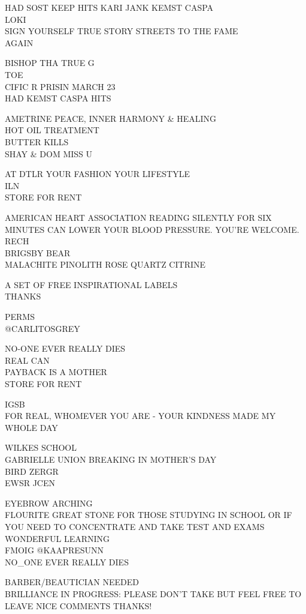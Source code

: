 \documentclass[10pt,letterpaper]{article}
\begin{document}
HAD SOST KEEP HITS KARI JANK KEMST CASPA\\
LOKI\\
SIGN YOURSELF TRUE STORY STREETS TO THE FAME\\
AGAIN

BISHOP THA TRUE G\\
TOE\\
CIFIC R PRISIN MARCH 23\\
HAD KEMST CASPA HITS

AMETRINE PEACE, INNER HARMONY \& HEALING\\
HOT OIL TREATMENT\\
BUTTER KILLS\\
SHAY \& DOM MISS U

AT DTLR YOUR FASHION YOUR LIFESTYLE\\
ILN\\
STORE FOR RENT

AMERICAN HEART ASSOCIATION READING SILENTLY FOR SIX MINUTES CAN LOWER YOUR BLOOD PRESSURE.  YOU'RE WELCOME.\\
RECH\\
BRIGSBY BEAR\\
MALACHITE PINOLITH ROSE QUARTZ CITRINE

A SET OF FREE INSPIRATIONAL LABELS\\
THANKS

PERMS\\
@CARLITOSGREY

NO{-}ONE EVER REALLY DIES\\
REAL CAN\\
PAYBACK IS A MOTHER\\
STORE FOR RENT

IGSB\\
FOR REAL, WHOMEVER YOU ARE {-} YOUR KINDNESS MADE MY WHOLE DAY

WILKES SCHOOL\\
GABRIELLE UNION BREAKING IN MOTHER'S DAY\\
BIRD ZERGR\\
EWSR JCEN

EYEBROW ARCHING\\
FLOURITE GREAT STONE FOR THOSE STUDYING IN SCHOOL OR IF YOU NEED TO CONCENTRATE AND TAKE TEST AND EXAMS WONDERFUL LEARNING\\
FMOIG @KAAPRESUNN\\
NO\_ONE EVER  REALLY DIES

BARBER/BEAUTICIAN NEEDED\\
BRILLIANCE IN PROGRESS: PLEASE DON'T TAKE BUT FEEL FREE TO LEAVE NICE COMMENTS THANKS!
\end{document}
